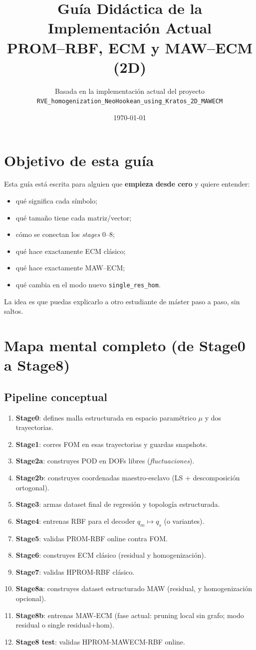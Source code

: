 \documentclass[11pt,a4paper]{article}
\title{Guía Didáctica de la Implementación Actual\\
PROM--RBF, ECM y MAW--ECM (2D)}
\author{Basada en la implementación actual del proyecto\\
\texttt{RVE\_homogenization\_NeoHookean\_using\_Kratos\_2D\_MAWECM}}
\date{\today}
\begin{document}
\maketitle
\tableofcontents

\section{Objetivo de esta guía}
Esta guía está escrita para alguien que \textbf{empieza desde cero} y quiere entender:
\begin{itemize}[leftmargin=1.5em]
\item qué significa cada símbolo;
\item qué tamaño tiene cada matriz/vector;
\item cómo se conectan los \textit{stages} 0--8;
\item qué hace exactamente ECM clásico;
\item qué hace exactamente MAW--ECM;
\item qué cambia en el modo nuevo \texttt{single\_res\_hom}.
\end{itemize}

\noindent
La idea es que puedas explicarlo a otro estudiante de máster paso a paso, sin saltos.

\section{Mapa mental completo (de Stage0 a Stage8)}
\subsection{Pipeline conceptual}
\begin{enumerate}[leftmargin=1.5em]
\item \textbf{Stage0}: defines malla estructurada en espacio paramétrico $\mu$ y dos trayectorias.
\item \textbf{Stage1}: corres FOM en esas trayectorias y guardas snapshots.
\item \textbf{Stage2a}: construyes POD en DOFs libres (\textit{fluctuaciones}).
\item \textbf{Stage2b}: construyes coordenadas maestro-esclavo (LS + descomposición ortogonal).
\item \textbf{Stage3}: armas dataset final de regresión y topología estructurada.
\item \textbf{Stage4}: entrenas RBF para el decoder $q_m \mapsto q_s$ (o variantes).
\item \textbf{Stage5}: validas PROM-RBF online contra FOM.
\item \textbf{Stage6}: construyes ECM clásico (residual y homogenización).
\item \textbf{Stage7}: validas HPROM-RBF clásico.
\item \textbf{Stage8a}: construyes dataset estructurado MAW (residual, y homogenización opcional).
\item \textbf{Stage8b}: entrenas MAW-ECM (fase actual: pruning local sin grafo; modo residual o single residual+hom).
\item \textbf{Stage8 test}: validas HPROM-MAWECM-RBF online.
\end{enumerate}
\end{document}
